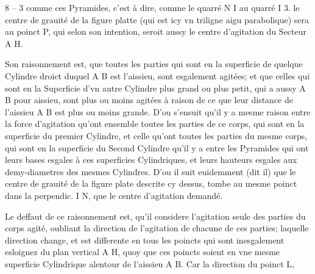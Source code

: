 \documentclass[11pt,a4paper]{article}
\begin{document}


8 -- 3 comme ces Pyramides, c'est à dire, comme le quarré N I au quarré I 3. le centre de grauité de la figure platte (qui est icy vn triligne aigu parabolique) sera au poinct P, qui selon son intention, seroit aussy le centre d'agitation du Secteur A H.

Son raisonnement est, que toutes les parties qui sont en la superficie de quelque Cylindre droict duquel A B est l'aissieu, sont esgalement agitées; et que celles qui sont en la Superficie d'vn autre Cylindre plus grand ou plus petit, qui a aussy A B pour aissieu, sont plus ou moins agitées à raison de ce que leur distance de l'aissieu A B est plus ou moins grande. D'ou s'ensuit qu'il y a mesme raison entre la force d'agitation qu'ont ensemble toutes les parties de ce corps, qui sont en la superficie du premier Cylindre, et celle qu'ont toutes les parties du mesme corps, qui sont en la superficie du Second Cylindre qu'il y a entre les Pyramides qui ont leurs bases esgales à ces superficies Cylindriques, et leurs hauteurs esgales aux demy-diametres des mesmes Cylindres. D'ou il suit euidemment (dit il) que le centre de grauité de la figure plate descrite cy dessus, tombe au mesme poinct dans la perpendic. I N, que le centre d'agitation demandé.

Le deffaut de ce raisonnement est, qu'il considere l'agitation seule des parties du corps agité, oubliant la direction de l'agitation de chacune de ces parties; laquelle direction change, et est differente en tous les poincts qui sont inesgalement esloignez du plan vertical A H, quoy que ces poincts soient en vne mesme superficie Cylindrique alentour de l'aissieu A B. Car la direction du poinct L,

\end{document}
